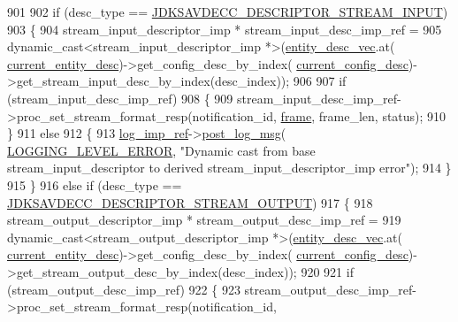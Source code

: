 \begin{DoxyCode}
{{901 
902         \textcolor{keywordflow}{if} (desc\_type == \hyperlink{group__descriptor_ga4eb0b7597f11b5fc36f3625acd82e503}{JDKSAVDECC\_DESCRIPTOR\_STREAM\_INPUT})
903         \{
904             stream\_input\_descriptor\_imp * stream\_input\_desc\_imp\_ref =
905                 \textcolor{keyword}{dynamic\_cast<}stream\_input\_descriptor\_imp *\textcolor{keyword}{>}(\hyperlink{classavdecc__lib_1_1end__station__imp_a72edab41bc56e3c1757944a7df188a3d}{entity\_desc\_vec}.at(
      \hyperlink{classavdecc__lib_1_1end__station__imp_afd78c89df26ba7641e1adb764c0e827d}{current\_entity\_desc})->get\_config\_desc\_by\_index(
      \hyperlink{classavdecc__lib_1_1end__station__imp_a60b1af40d35e8a86b0082c54ab6cb6a8}{current\_config\_desc})->get\_stream\_input\_desc\_by\_index(desc\_index));
906 
907             \textcolor{keywordflow}{if} (stream\_input\_desc\_imp\_ref)
908             \{
909                 stream\_input\_desc\_imp\_ref->proc\_set\_stream\_format\_resp(notification\_id, 
      \hyperlink{gst__avb__playbin_8c_ac8e710e0b5e994c0545d75d69868c6f0}{frame}, frame\_len, status);
910             \}
911             \textcolor{keywordflow}{else}
912             \{
913                 \hyperlink{namespaceavdecc__lib_acbe3e2a96ae6524943ca532c87a28529}{log\_imp\_ref}->\hyperlink{classavdecc__lib_1_1log_a68139a6297697e4ccebf36ccfd02e44a}{post\_log\_msg}(
      \hyperlink{namespaceavdecc__lib_a501055c431e6872ef46f252ad13f85cdaf2c4481208273451a6f5c7bb9770ec8a}{LOGGING\_LEVEL\_ERROR}, \textcolor{stringliteral}{"Dynamic cast from base stream\_input\_descriptor to derived
       stream\_input\_descriptor\_imp error"});
914             \}
915         \}
916         \textcolor{keywordflow}{else} \textcolor{keywordflow}{if} (desc\_type == \hyperlink{group__descriptor_gab458eb4963f42bfa5591d5dd604bedce}{JDKSAVDECC\_DESCRIPTOR\_STREAM\_OUTPUT})
917         \{
918             stream\_output\_descriptor\_imp * stream\_output\_desc\_imp\_ref =
919                 \textcolor{keyword}{dynamic\_cast<}stream\_output\_descriptor\_imp *\textcolor{keyword}{>}(\hyperlink{classavdecc__lib_1_1end__station__imp_a72edab41bc56e3c1757944a7df188a3d}{entity\_desc\_vec}.at(
      \hyperlink{classavdecc__lib_1_1end__station__imp_afd78c89df26ba7641e1adb764c0e827d}{current\_entity\_desc})->get\_config\_desc\_by\_index(
      \hyperlink{classavdecc__lib_1_1end__station__imp_a60b1af40d35e8a86b0082c54ab6cb6a8}{current\_config\_desc})->get\_stream\_output\_desc\_by\_index(desc\_index));
920 
921             \textcolor{keywordflow}{if} (stream\_output\_desc\_imp\_ref)
922             \{
923                 stream\_output\_desc\_imp\_ref->proc\_set\_stream\_format\_resp(notification\_id, 
}}
\end{DoxyCode}
